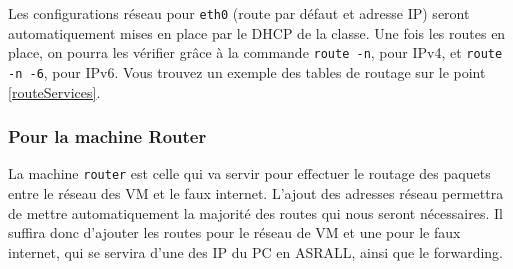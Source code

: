 			Les configurations réseau pour \verb?eth0? (route par défaut et adresse IP) seront automatiquement mises en place par le DHCP de la classe. Une fois les routes en place, on pourra les vérifier grâce à la commande \verb?route -n?, pour IPv4, et \verb?route -n -6?, pour IPv6. Vous trouvez un exemple des tables de routage sur le point \ref{routeServices}.


		\subsubsection{Pour la machine Router}
			\vspace{0.3cm}
			La machine \verb?router? est celle qui va servir pour effectuer le routage des paquets entre le réseau des VM et le faux internet. L'ajout des adresses réseau permettra de mettre automatiquement la majorité des routes qui nous seront nécessaires. Il suffira donc d'ajouter les routes pour le réseau de VM et une pour le faux internet, qui se servira d'une des IP du PC en ASRALL, ainsi que le forwarding.\\

			\\

